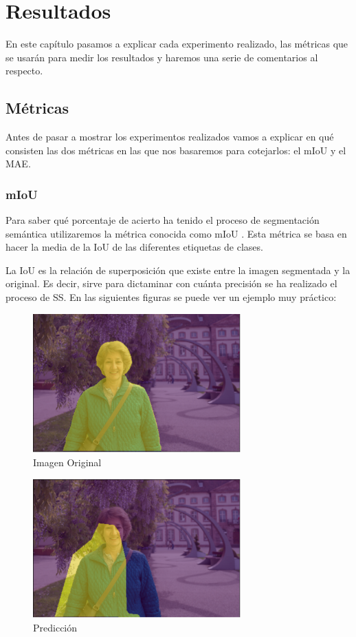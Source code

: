 \chapter{Resultados}

En este capítulo pasamos a explicar cada experimento realizado, las métricas que se usarán para medir los resultados y haremos una serie de comentarios al respecto.

\section{Métricas}

Antes de pasar a mostrar los experimentos realizados vamos a explicar en qué consisten las dos métricas en las que nos basaremos para cotejarlos: el \ac{mIoU} y el \ac{MAE}.

\subsection{mIoU}

Para saber qué porcentaje de acierto ha tenido el proceso de segmentación semántica utilizaremos la métrica conocida como \ac{mIoU} \cite{miou-iou}. Esta métrica se basa en hacer la media de la \ac{IoU} de las diferentes etiquetas de clases.

La \ac{IoU} \cite{miou-iou} es la relación de superposición que existe entre la imagen segmentada y la original. Es decir, sirve para dictaminar con cuánta precisión se ha realizado el proceso de \ac{SS}. En las siguientes figuras se puede ver un ejemplo muy práctico:

\begin{figure}[H]
  \centering
  \includegraphics[width=8cm]{Figuras/Iou_1.eps}
  \caption{Imagen Original}
\end{figure}

\begin{figure}[H]
  \centering
  \includegraphics[width=8cm]{Figuras/IoU_2.eps}
  \caption{Predicción}
\end{figure}

